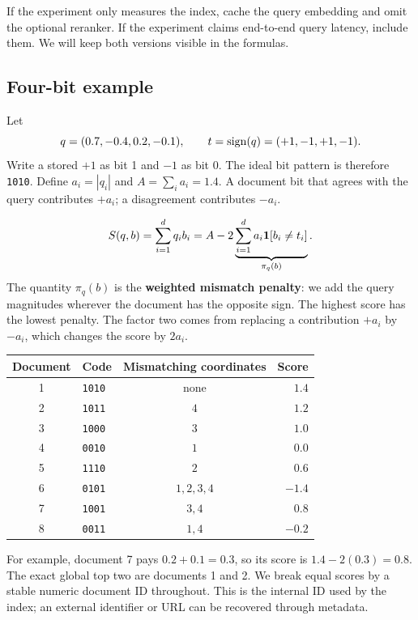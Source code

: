If the experiment only measures the index, cache the query embedding and omit the optional
reranker. If the experiment claims end-to-end query latency, include them. We will keep both
versions visible in the formulas.

\subsection{Four-bit example}
Let
\[
q=(0.7,-0.4,0.2,-0.1),\qquad t=\operatorname{sign}(q)=(+1,-1,+1,-1).
\]
Write a stored $+1$ as bit 1 and $-1$ as bit 0. The ideal bit pattern is therefore
\texttt{1010}. Define $a_i=|q_i|$ and $A=\sum_i a_i=1.4$. A document bit that agrees with the
query contributes $+a_i$; a disagreement contributes $-a_i$.

\begin{equation}
S(q,b)=\sum_{i=1}^{d}q_i b_i
       =A-2\underbrace{\sum_{i=1}^{d}a_i\mathbf 1[b_i\ne t_i]}_{\pi_q(b)}.
\label{eq:score}
\end{equation}
The quantity $\pi_q(b)$ is the \textbf{weighted mismatch penalty}: we add the query
magnitudes wherever the document has the opposite sign. The highest score has the lowest penalty. The factor two comes from replacing a
contribution $+a_i$ by $-a_i$, which changes the score by $2a_i$.

\begin{center}
\begin{tabular}{@{}clcr@{}}\toprule
Document & Code & Mismatching coordinates & Score\\\midrule
1 & \texttt{1010} & none & $1.4$\\
2 & \texttt{1011} & $4$ & $1.2$\\
3 & \texttt{1000} & $3$ & $1.0$\\
4 & \texttt{0010} & $1$ & $0.0$\\
5 & \texttt{1110} & $2$ & $0.6$\\
6 & \texttt{0101} & $1,2,3,4$ & $-1.4$\\
7 & \texttt{1001} & $3,4$ & $0.8$\\
8 & \texttt{0011} & $1,4$ & $-0.2$\\\bottomrule
\end{tabular}
\end{center}
For example, document 7 pays $0.2+0.1=0.3$, so its score is $1.4-2(0.3)=0.8$.
The exact global top two are documents 1 and 2. We break equal scores by a stable numeric document ID throughout. This is the internal ID used by the index; an external identifier or URL can be recovered through metadata.

